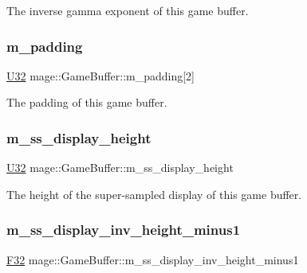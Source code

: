 The inverse gamma exponent of this game buffer. \hypertarget{structmage_1_1_game_buffer_a6ab9b395e6cf4a6e120bb7ddf4be6913}{}\label{structmage_1_1_game_buffer_a6ab9b395e6cf4a6e120bb7ddf4be6913} 
\subsubsection{\texorpdfstring{m\+\_\+padding}{m\_padding}}
{\footnotesize\ttfamily \hyperlink{namespacemage_a41c104c036fba3756a74e19f793eeaa1}{U32} mage\+::\+Game\+Buffer\+::m\+\_\+padding\mbox{[}2\mbox{]}}

The padding of this game buffer. \hypertarget{structmage_1_1_game_buffer_a95b2766f3320627910ec153b512e5695}{}\label{structmage_1_1_game_buffer_a95b2766f3320627910ec153b512e5695} 
\subsubsection{\texorpdfstring{m\+\_\+ss\+\_\+display\+\_\+height}{m\_ss\_display\_height}}
{\footnotesize\ttfamily \hyperlink{namespacemage_a41c104c036fba3756a74e19f793eeaa1}{U32} mage\+::\+Game\+Buffer\+::m\+\_\+ss\+\_\+display\+\_\+height}

The height of the super-\/sampled display of this game buffer. \hypertarget{structmage_1_1_game_buffer_a28079651a44977c137e07c88de9caabc}{}\label{structmage_1_1_game_buffer_a28079651a44977c137e07c88de9caabc} 
\subsubsection{\texorpdfstring{m\+\_\+ss\+\_\+display\+\_\+inv\+\_\+height\+\_\+minus1}{m\_ss\_display\_inv\_height\_minus1}}
{\footnotesize\ttfamily \hyperlink{namespacemage_aa97e833b45f06d60a0a9c4fc22ae02c0}{F32} mage\+::\+Game\+Buffer\+::m\+\_\+ss\+\_\+display\+\_\+inv\+\_\+height\+\_\+minus1}

